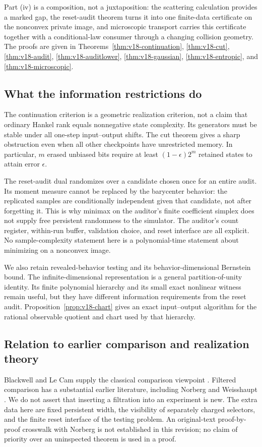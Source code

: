 Part (iv) is a composition, not a juxtaposition: the scattering calculation
provides a marked gap, the reset-audit theorem turns it into one finite-data
certificate on the nonconvex private image, and microscopic transport
carries this certificate together with a conditional-law consumer through
a changing collision geometry. The proofs are given in
Theorems~\ref{thm:v18-continuation}, \ref{thm:v18-cut},
\ref{thm:v18-audit}, \ref{thm:v18-auditlower},
\ref{thm:v18-gaussian}, \ref{thm:v18-entropic}, and
\ref{thm:v18-microscopic}.

\subsection{What the information restrictions do}
The continuation criterion is a geometric realization criterion, not a
claim that ordinary Hankel rank equals nonnegative state complexity. Its
generators must be stable under all one-step input--output shifts. The
cut theorem gives a sharp obstruction even when all other checkpoints
have unrestricted memory. In particular, $m$ erased unbiased bits require
at least $(1-\epsilon)2^m$ retained states to attain error $\epsilon$.

The reset-audit dual randomizes over a candidate chosen once for an entire
audit. Its moment measure cannot be replaced by the barycenter behavior:
the replicated samples are conditionally independent given that candidate,
not after forgetting it. This is why minimax on the auditor's finite
coefficient simplex does not supply free persistent randomness to the
simulator. The auditor's count register, within-run buffer, validation
choice, and reset interface are all explicit. No sample-complexity statement
here is a polynomial-time statement about minimizing on a nonconvex image.

We also retain revealed-behavior testing and its behavior-dimensional
Bernstein bound. The infinite-dimensional representation is a general
partition-of-unity identity. Its finite polynomial hierarchy and its small
exact nonlinear witness remain useful, but they have different information
requirements from the reset audit. Proposition~\ref{prop:v18-chart} gives
an exact input--output algorithm for the rational observable quotient and
chart used by that hierarchy.

\subsection{Relation to earlier comparison and realization theory}
Blackwell and Le Cam supply the classical comparison viewpoint
\cite{Blackwell1953,LeCam1964,Torgersen1991}. Filtered comparison has a
substantial earlier literature, including Norberg and Weisshaupt
\cite{Norberg2002,Weisshaupt2006}. We do not assert that inserting a
filtration into an experiment is new. The extra data here are fixed
persistent width, the visibility of separately charged selectors, and the
finite reset interface of the testing problem. An original-text
proof-by-proof crosswalk with Norberg is not established in this revision;
no claim of priority over an uninspected theorem is used in a proof.

